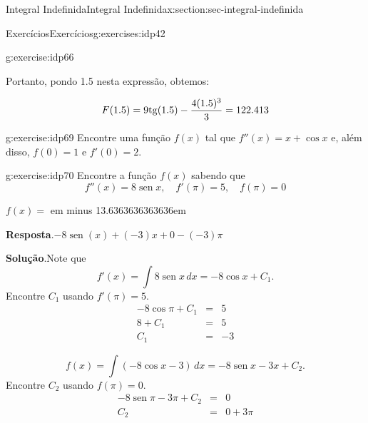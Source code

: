 \documentclass[oneside,10pt,]{article}
\newcommand{\blocktitlefont}{\relax}
\newcommand{\fillin}[1]{\leavevmode\leaders\vrule height -1.2pt depth 1.5pt \hskip #1em minus #1em \null}
\numberwithin{equation}{section}
\DeclareMathOperator{\sin}{sen}
\newcommand{\amp}{&}
\begin{document}
\begin{sectionptx}{Integral Indefinida}{}{Integral Indefinida}{}{}{x:section:sec-integral-indefinida}
\begin{exercises-subsection}{Exercícios}{}{Exercícios}{}{}{g:exercises:idp42}
\begin{divisionexercise}{8}{}{}{g:exercise:idp66}
\par
Portanto, pondo 1.5 nesta expressão, obtemos:%
\par
%
\begin{equation*}
F(1.5) = 9\rm{tg}(1.5) - \frac{ 4(1.5)^3 }{ 3 }
= 122.413
\end{equation*}
%
\end{divisionexercise}%
\begin{divisionexercise}{9}{}{}{g:exercise:idp69}%
Encontre uma função \(f(x)\) tal que \(f''(x) = x + \cos{x}\) e, além disso, \(f (0) = 1\) e \(f'(0) = 2\).%
\end{divisionexercise}%
\begin{divisionexercise}{10}{}{}{g:exercise:idp70}%
Encontre a função \(f(x)\) sabendo que%
\begin{equation*}
f''(x) = 8 \sin x, \quad f'(\pi) = 5, \quad f(\pi) = 0
\end{equation*}
%
\par
\(f(x) =\) \fillin{13.6363636363636}%
\par\smallskip%
\noindent\textbf{\blocktitlefont Resposta}.\hypertarget{g:answer:idp71}{}\quad{}\(-8\sin\!\left(x\right)+\left(-3\right)x+0-\left(-3\right)\pi \)%
\par\smallskip%
\noindent\textbf{\blocktitlefont Solução}.\hypertarget{g:solution:idp72}{}\quad{}Note que%
\begin{equation*}
f'(x) = \int 8 \sin x \, dx = -8 \cos x + C_1.
\end{equation*}
Encontre \(C_1\) usando \(f'(\pi) = 5\).%
\begin{equation*}
\begin{array}{rcl}
-8 \cos \pi + C_1 \amp =\amp  5\\
8 + C_1 \amp =\amp  5\\
C_1 \amp =\amp  -3
\end{array}
\end{equation*}
%
\par
%
\begin{equation*}
f(x) = \int \left( -8 \cos x  - 3 \right) \, dx 
= -8 \sin x  - 3 x + C_2.
\end{equation*}
Encontre  \(C_2\) usando \(f(\pi) = 0\).%
\begin{equation*}
\begin{array}{rcl}
-8 \sin \pi  - 3 \pi + C_2 \amp =\amp  0\\
C_2 \amp =\amp  0  + 3 \pi
\end{array}
\end{equation*}
%
\par

\end{divisionexercise}
\end{exercises-subsection}
\end{sectionptx}
\end{document}
